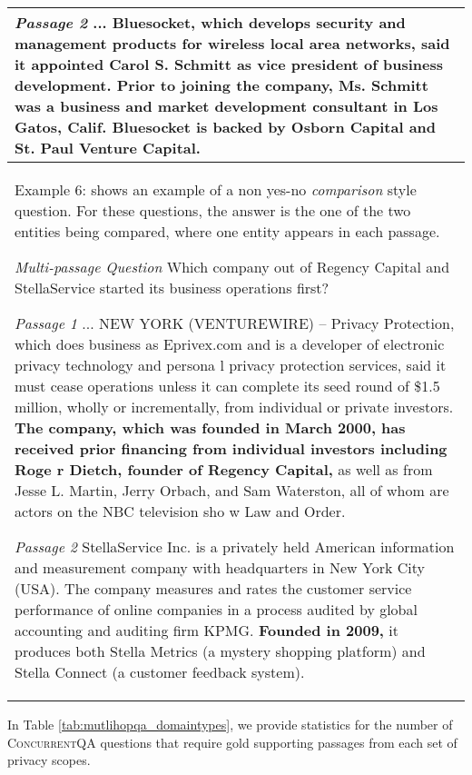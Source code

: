 \documentclass{article}
\newcommand{\blue}[1]{{\color{blue}#1}}
\newcommand{\datasetname}{\textsc{ConcurrentQA}\xspace}
\begin{document}
\begin{table*}[t]
\begin{tabular}{p{15cm}}
\textit{Passage 2} ... \textbf{Bluesocket, which develops security and management products for wireless local area networks, said it appointed Carol S. Schmitt as vice president} of business development. Prior to joining the company, Ms. Schmitt was a business and market development consultant in Los Gatos, Calif. Bluesocket is backed by Osborn Capital and St. Paul Venture Capital.
\\
\midrule
\blue{Example 6: shows an example of a non yes-no \textit{comparison} style question. For these questions, the answer is the one of the two entities being compared, where one entity appears in each passage.}\newline

\textit{Multi-passage Question} Which company out of Regency Capital and StellaService started its business operations first? \newline

\textit{Passage 1} ... NEW YORK (VENTUREWIRE) -- Privacy Protection, which does business as Eprivex.com and is a developer of electronic privacy technology and persona l privacy protection services, said it must cease operations unless it can complete its seed round of \$1.5 million, wholly or incrementally, from individual or private investors. \textbf{The company, which was founded in March 2000, has received prior financing from individual investors including Roge r Dietch, founder of Regency Capital,} as well as from Jesse L. Martin, Jerry Orbach, and Sam Waterston, all of whom are actors on the NBC television sho w Law and Order. \newline

\textit{Passage 2} StellaService Inc. is a privately held American information and measurement company with headquarters in New York City (USA). The company measures and rates the customer service performance of online companies in a process audited by global accounting and auditing firm KPMG. \textbf{Founded in 2009,} it produces both Stella Metrics (a mystery shopping platform) and Stella Connect (a customer feedback system).
\\
\bottomrule
\end{tabular}
\vspace{3mm}
\end{table*}



In Table \ref{tab:mutlihopqa_domaintypes}, we provide statistics for the number of \datasetname questions that require gold supporting passages from each set of privacy scopes.
\end{document}
